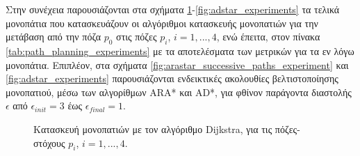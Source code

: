 Στην συνέχεια παρουσιάζονται στα σχήματα \ref{fig:dijkstra_experiments}-\ref{fig:adstar_experiments} τα τελικά μονοπάτια που κατασκευάζουν οι αλγόριθμοι κατασκευής μονοπατιών για την μετάβαση από την πόζα $p_0$ στις πόζες $p_i$, $i=1,...,4$, ενώ έπειτα, στον πίνακα \ref{tab:path_planning_experiments} με τα αποτελέσματα των μετρικών για τα εν λόγω μονοπάτια. Επιπλέον, στα σχήματα \ref{fig:arastar_successive_paths_experiment} και \ref{fig:adstar_experiments} παρουσιάζονται ενδεικτικές ακολουθίες βελτιστοποίησης μονοπατιού, μέσω των αλγορίθμων ARA* και AD*, για φθίνον παράγοντα διαστολής $\epsilon$ από $\epsilon_{init}=3$ έως $\epsilon_{final}=1$.

\begin{figure}[!ht]
	\centering
	 \vspace{0.01\linewidth}
	 \vspace{0.01\linewidth}
 	 \vspace{0.01\linewidth}
	\caption{Κατασκευή μονοπατιών με τον αλγόριθμο Dijkstra, για τις πόζες-στόχους $p_i$, $i=1,...,4$.}
	\label{fig:dijkstra_experiments}
\end{figure}

